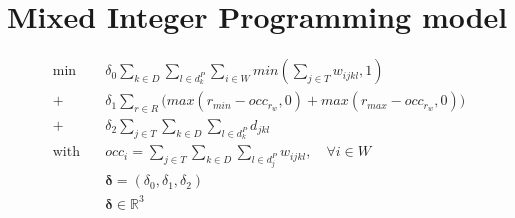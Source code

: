 \documentclass[../../thesis.tex]{subfiles}
\begin{document}
\chapter{Mixed Integer Programming model}

\begingroup
\allowdisplaybreaks
\begin{subequations}
  \begin{align*}
    \textrm{min} \quad & \delta_0 \sum_{k \in D} \sum_{l \in d^P_k} \sum_{i \in W} min(\sum_{j \in T} w_{ijkl}, 1)  \\ 
      + \ & \delta_1 \sum_{r \in R} \big( max(r_{min} - occ_{r_{w}}, 0) + max(r_{max} - occ_{r_{w}}, 0) \big)   \\ 
      + \ &\delta_2 \sum_{j \in T}\sum_{k\in D}\sum_{l \in d^P_k} d_{jkl}  \\ 
     \textrm{with} \quad & occ_i = \sum_{j \in T} \sum_{k \in D} \sum_{l \in d^P_j} w_{ijkl}, \quad \forall i \in W  \nonumber \\ 
                         & \bm{\delta} = (\delta_0, \delta_1, \delta_2) \nonumber \\ 
                         & \bm{\delta} \in \mathbb{R}^3
  \end{align*}
\end{subequations}
\end{document}
